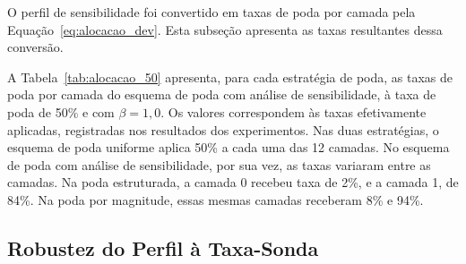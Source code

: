 O perfil de sensibilidade foi convertido em taxas de poda por camada pela
Equação~\ref{eq:alocacao_dev}. Esta subseção apresenta as taxas
resultantes dessa conversão.

A Tabela~\ref{tab:alocacao_50} apresenta, para cada estratégia de poda, as taxas de poda por
camada do esquema de poda com análise de sensibilidade, à taxa de poda de 50\% e com $\beta =
1{,}0$. Os valores correspondem às taxas efetivamente aplicadas, registradas nos resultados dos
experimentos. Nas duas estratégias, o esquema de poda uniforme aplica 50\% a cada uma das 12
camadas. No esquema de poda com análise de sensibilidade, por sua vez, as taxas variaram entre
as camadas. Na poda estruturada, a camada 0 recebeu taxa de 2\%, e a camada 1, de 84\%. Na poda
por magnitude, essas mesmas camadas receberam 8\% e 94\%.

\begin{table}[htb]
\centering
\caption{Taxas de poda por camada aplicadas à taxa de poda de 50\%, com $\beta = 1{,}0$.}
\label{tab:alocacao_50}
\small

\end{table}

\subsection{Robustez do Perfil à Taxa-Sonda}\label{subsec:robustez_sonda}

